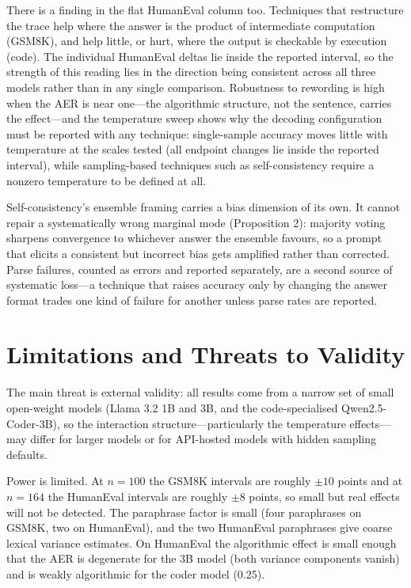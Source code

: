 \documentclass[conference]{IEEEtran}
\begin{document}
There is a finding in the flat HumanEval column too.  Techniques that
restructure the trace help where the answer is the product of
intermediate computation (GSM8K), and help little, or hurt, where the
output is checkable by execution (code).  The individual HumanEval
deltas lie inside the reported interval, so the strength of this
reading lies in the direction being consistent across all three
models rather than in any single comparison.  Robustness to
rewording is high when the AER is near one---the algorithmic
structure, not the sentence, carries the effect---and the temperature
sweep shows why the decoding configuration must be reported with any
technique: single-sample accuracy moves little with temperature at
the scales tested (all endpoint changes lie inside the reported
interval), while sampling-based techniques such as self-consistency
require a nonzero temperature to be defined at all.

Self-consistency's ensemble framing carries a bias dimension of its
own.  It cannot repair a systematically wrong marginal mode
(Proposition 2): majority voting sharpens convergence to whichever
answer the ensemble favours, so a prompt that elicits a consistent
but incorrect bias gets amplified rather than corrected.  Parse
failures, counted as errors and reported separately, are a second
source of systematic loss---a technique that raises accuracy only by
changing the answer format trades one kind of failure for another
unless parse rates are reported.

\section{Limitations and Threats to Validity}
\label{sec:limitations}

The main threat is external validity: all results come from a narrow
set of small open-weight models (Llama 3.2 1B and 3B, and the
code-specialised Qwen2.5-Coder-3B), so the interaction
structure---particularly the temperature effects---may differ for
larger models or for API-hosted models with hidden sampling
defaults.

Power is limited.  At $n = 100$ the GSM8K intervals are roughly
$\pm 10$ points and at $n = 164$ the HumanEval intervals are roughly
$\pm 8$ points, so small but real effects will not be detected.  The
paraphrase factor is small (four paraphrases on GSM8K, two on
HumanEval), and the two HumanEval paraphrases give coarse lexical
variance estimates.  On HumanEval the algorithmic effect is small
enough that the AER is degenerate for the 3B model (both variance
components vanish) and is weakly algorithmic for the coder model
(0.25).
\end{document}
